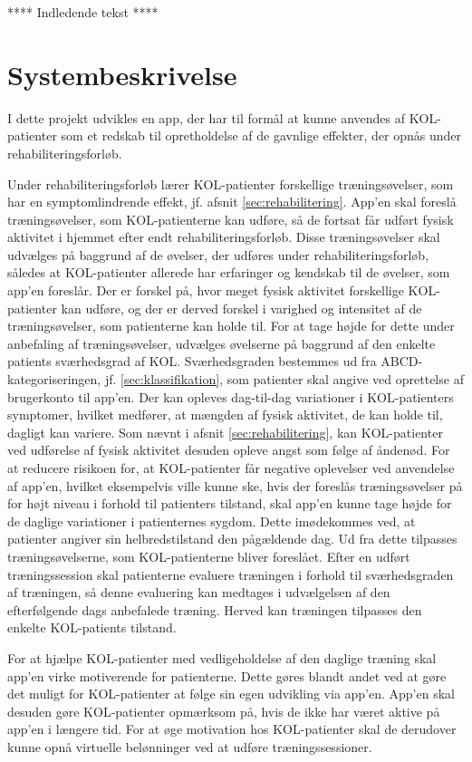 ****      Indledende tekst     ****

\section{Systembeskrivelse} \label{sec:systembeskrivelse}
I dette projekt udvikles en app, der har til formål at kunne anvendes af KOL-patienter som et redskab til opretholdelse af de gavnlige effekter, der opnås under rehabiliteringsforløb.

Under rehabiliteringsforløb lærer KOL-patienter forskellige træningsøvelser, som har en symptomlindrende effekt, jf. afsnit \ref{sec:rehabilitering}. App’en skal foreslå træningsøvelser, som KOL-patienterne kan udføre, så de fortsat får udført fysisk aktivitet i hjemmet efter endt rehabiliteringsforløb. Disse træningsøvelser skal udvælges på baggrund af de øvelser, der udføres under rehabiliteringsforløb, således at KOL-patienter allerede har erfaringer og kendskab til de øvelser, som app’en foreslår.
Der er forskel på, hvor meget fysisk aktivitet forskellige KOL-patienter kan udføre, og der er derved forskel i varighed og intensitet af de træningsøvelser, som patienterne kan holde til. For at tage højde for dette under anbefaling af træningsøvelser, udvælges øvelserne på baggrund af den enkelte patients sværhedsgrad af KOL. Sværhedsgraden bestemmes ud fra ABCD-kategoriseringen, jf. \ref{sec:klassifikation}, som patienter skal angive ved oprettelse af brugerkonto til app’en.
Der kan opleves dag-til-dag variationer i KOL-patienters symptomer, hvilket medfører, at mængden af fysisk aktivitet, de kan holde til, dagligt kan variere. Som nævnt i afsnit \ref{sec:rehabilitering}, kan KOL-patienter ved udførelse af fysisk aktivitet desuden opleve angst som følge af åndenød. For at reducere risikoen for, at KOL-patienter får negative oplevelser ved anvendelse af app’en, hvilket eksempelvis ville kunne ske, hvis der foreslås træningsøvelser på for højt niveau i forhold til patienters tilstand, skal app’en kunne tage højde for de daglige variationer i patienternes sygdom. Dette imødekommes ved, at patienter angiver sin helbredstilstand den pågældende dag. Ud fra dette tilpasses træningsøvelserne, som KOL-patienterne bliver foreslået. Efter en udført træningssession skal patienterne evaluere træningen i forhold til sværhedsgraden af træningen, så denne evaluering kan medtages i udvælgelsen af den efterfølgende dags anbefalede træning. Herved kan træningen tilpasses den enkelte KOL-patients tilstand.

For at hjælpe KOL-patienter med vedligeholdelse af den daglige træning skal app’en virke motiverende for patienterne. Dette gøres blandt andet ved at gøre det muligt for KOL-patienter at følge sin egen udvikling via app’en. App’en skal desuden gøre KOL-patienter opmærksom på, hvis de ikke har været aktive på app'en i længere tid. For at øge motivation hos KOL-patienter skal de derudover kunne opnå virtuelle belønninger ved at udføre træningssessioner.

